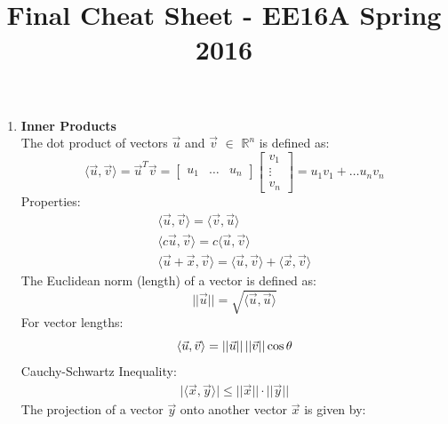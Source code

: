 \documentclass[10pt]{article}
\newcommand{\norm}[1]{\lvert #1 \rvert}
\begin{document}
\date{}
\title{\vspace{-5ex}Final Cheat Sheet - EE16A Spring 2016\vspace{-5ex}}
\maketitle
\begin{multicols}{2}
\begin{enumerate}
    \item \textbf{Inner Products} \\
    The dot product of vectors $\vec{u}$ and $\vec{v}$ $\in$ $\mathbb{R}^n$ is defined as:
    \begin{equation*}
       \langle \vec{u} , \vec{v} \rangle = \vec{u}^T\vec{v} = \begin{bmatrix} u_1 & \hdots & u_n \end{bmatrix}
        \begin{bmatrix} v_1 \\ \vdots \\ v_n \end{bmatrix}
       = u_1v_1+\ldots u_nv_n
    \end{equation*}
    Properties:
    \begin{align*}
        \langle \vec{u} , \vec{v} \rangle  = \langle \vec{v} , \vec{u} \rangle \\
        \langle c\vec{u} , \vec{v} \rangle = c\langle \vec{u} , \vec{v} \rangle \\
        \langle \vec{u} +\vec{x}, \vec{v} \rangle = \langle \vec{u} , \vec{v} \rangle + \langle \vec{x} , \vec{v} \rangle
    \end{align*}
    The Euclidean norm (length) of a vector is defined as:
    \begin{equation*}
        \norm{\norm{\vec{u}}}=\sqrt{\langle \vec{u}, \vec{u} \rangle}
    \end{equation*}
    For vector lengths:
    \begin{equation*}
        \langle \vec{u}, \vec{v} \rangle=\norm{\norm{\vec{u}}}\hspace{.5mm}\norm{\norm{\vec{v}}}\cos{\theta}
    \end{equation*}
    Cauchy-Schwartz Inequality:
    \begin{align*}
        \norm{\langle\vec{x},\vec{y}\rangle} \leq  \norm{\norm{\vec{x}}} \cdot \norm{\norm{\vec{y}}}
    \end{align*}
    The projection of a vector $\vec{y}$ onto another vector $\vec{x}$ is given by:
    \begin{align*}

\end{align*}
\end{enumerate}
\end{multicols}
\end{document}
